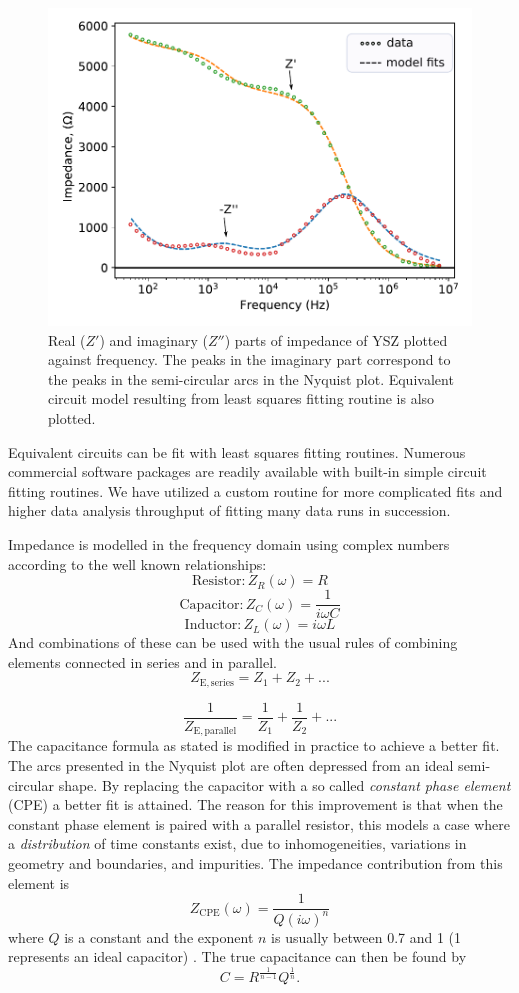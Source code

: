 \begin{figure}
    \centering
    \includegraphics{Figures/190603-YSZ-bode-and-fit-edit.pdf}
    \caption{Real ($Z'$) and imaginary ($Z''$) parts of impedance of YSZ plotted against frequency. The peaks in the imaginary part correspond to the peaks in the semi-circular arcs in the Nyquist plot. Equivalent circuit model resulting from least squares fitting routine is also plotted.}
    \label{meth:fig:eis:bode:ysz}
\end{figure}
Equivalent circuits can be fit with least squares fitting routines. Numerous commercial software packages are readily available with built-in simple circuit fitting routines. We have utilized a custom routine for more complicated fits and higher data analysis throughput of fitting many data runs in succession. 

Impedance is modelled in the frequency domain using complex numbers according to the well known relationships:
\[\mathrm{Resistor: }Z_R(\omega)=R\]
\[\mathrm{Capacitor: }Z_C(\omega)=\frac{1}{i\omega C}\]
\[\mathrm{Inductor: } Z_L(\omega)=i\omega L\]
And combinations of these can be used with the usual rules of combining elements connected in series and in parallel.
\[Z_{\mathrm{E, series}} = Z_1+Z_2+...\]

\[\frac{1}{Z_{\mathrm{E, parallel}}} = \frac{1}{Z_1}+\frac{1}{Z_2}+...\]
The capacitance formula as stated is modified in practice to achieve a better fit. The arcs presented in the Nyquist plot are often depressed from an ideal semi-circular shape. By replacing the capacitor with a so called \emph{constant phase element} (CPE) a better fit is attained. The reason for this improvement is that when the constant phase element is paired with a parallel resistor, this models a case where a \emph{distribution} of time constants exist, due to inhomogeneities, variations in geometry and boundaries, and impurities. The impedance contribution from this element is \[Z_{\mathrm{CPE}}(\omega)=\frac{1}{Q(i\omega)^{n}}\] where $Q$ is a constant and the exponent $n$ is usually between 0.7 and 1 (1 represents an ideal capacitor) \cite{Orazem2002}. The true capacitance can then be found by \[C = R^{\frac{1}{n-1}}Q^{\frac{1}{n}}.\]


